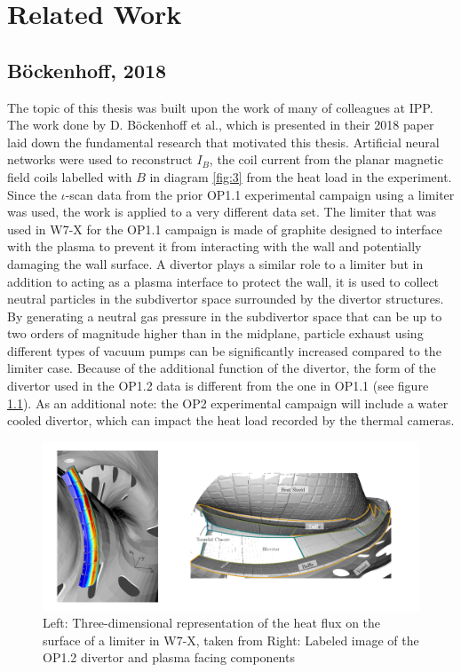 %
\chapter{Related Work}
\label{sec:related}

\section{Böckenhoff, 2018}
The topic of this thesis was built upon the work of many of colleagues at IPP. The work done by D. Böckenhoff et al., which is presented in their 2018 paper \cite{Böckenhoff_2018} laid down the fundamental research that motivated this thesis. Artificial neural networks were used to reconstruct $I_B$, the coil current from the planar magnetic field coils labelled with $B$ in diagram \ref{fig:3} from the heat load in the experiment. Since the $\iota$-scan data from the prior OP1.1 experimental campaign using a limiter was used, the work is applied to a very different data set. The limiter that was used in W7-X for the OP1.1 campaign is made of graphite designed to interface with the plasma to prevent it from interacting with the wall and potentially damaging the wall surface. A divertor plays a similar role to a limiter but in addition to acting as a plasma interface to protect the wall, it is used to collect neutral particles in the subdivertor space surrounded by the divertor structures. By generating a neutral gas pressure in the subdivertor space that can be up to two orders of magnitude higher than in the midplane, particle exhaust using different types of vacuum pumps can be significantly increased compared to the limiter case. Because of the additional function of the divertor, the form of the divertor used in the OP1.2 data is different  from the one in OP1.1 (see figure \ref{fig:limiter-divertor}). As an additional note: the OP2 experimental campaign will include a water cooled divertor, which can impact the heat load recorded by the thermal cameras.

\begin{figure}[!htb]
	\centering
	\includegraphics[width = \textwidth]{images/limiter-divetor.png}
	\caption{Left: Three-dimensional representation of the heat flux on the surface of a limiter in W7-X, taken from \cite{Böckenhoff_2018} Right: Labeled image of the OP1.2 divertor and plasma facing components} \label{fig:limiter-divertor}
\end{figure}

